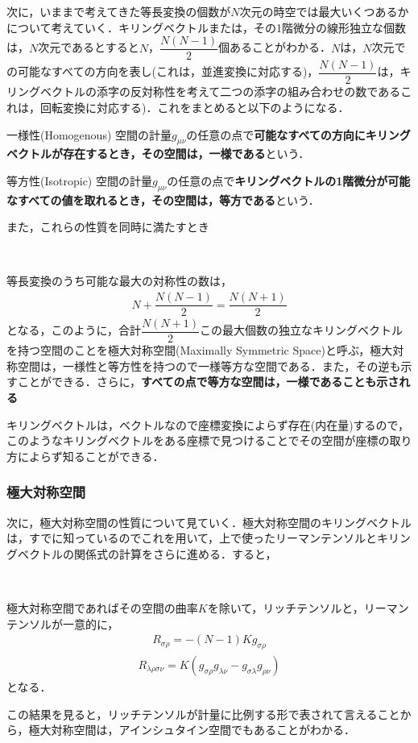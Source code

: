 次に，いままで考えてきた等長変換の個数が$N$次元の時空では最大いくつあるかについて考えていく．キリングベクトルまたは，その1階微分の線形独立な個数は，$N$次元であるとすると$N$，$\dfrac{N(N-1)}{2}$個あることがわかる．$N$は，$N$次元での可能なすべての方向を表し(これは，並進変換に対応する)，$\dfrac{N(N-1)}{2}$は，キリングベクトルの添字の反対称性を考えて二つの添字の組み合わせの数であるこれは，回転変換に対応する)．これをまとめると以下のようになる．
 \begin{itembox}[l]{一様性(Homogenous)}
空間の計量$g_{\mu\nu}$の任意の点で\textbf{可能なすべての方向にキリングベクトルが存在するとき，その空間は，一様である}という．
 \end{itembox}
 \begin{itembox}[l]{等方性(Isotropic)}
空間の計量$g_{\mu\nu}$の任意の点で\textbf{キリングベクトルの1階微分が可能なすべての値を取れるとき，その空間は，等方である}という．
\end{itembox}
また，これらの性質を同時に満たすとき
\begin{empheqboxed}
\

等長変換のうち可能な最大の対称性の数は，
\begin{eqnarray}
N+\dfrac{N(N-1)}{2}=\dfrac{N(N+1)}{2}
\end{eqnarray}
となる，このように，合計$\dfrac{N(N+1)}{2}$この最大個数の独立なキリングベクトルを持つ空間のことを極大対称空間(Maximally Symmetric Space)と呼ぶ，極大対称空間は，一様性と等方性を持つので一様等方な空間である．また，その逆も示すことができる．さらに，\textbf{すべての点で等方な空間は，一様であることも示される}
\cite{b5}
\end{empheqboxed}
キリングベクトルは，ベクトルなので座標変換によらず存在(内在量)するので，このようなキリングベクトルをある座標で見つけることでその空間が座標の取り方によらず知ることができる．

\subsubsection{極大対称空間}
次に，極大対称空間の性質について見ていく．極大対称空間のキリングベクトルは，すでに知っているのでこれを用いて，上で使ったリーマンテンソルとキリングベクトルの関係式の計算をさらに進める．すると，
\begin{empheqboxed}
\

極大対称空間であればその空間の曲率$K$を除いて，リッチテンソルと，リーマンテンソルが一意的に，
\begin{eqnarray}
R_{\sigma\rho}=-(N-1)Kg_{\sigma\rho}
\end{eqnarray}
\begin{eqnarray}
\label{RieMSS}
R_{\lambda\rho\sigma\nu}=K(g_{\sigma\rho}g_{\lambda\nu}-g_{\sigma\lambda}g_{\rho\nu})
\end{eqnarray}
となる．
\end{empheqboxed}
この結果を見ると，リッチテンソルが計量に比例する形で表されて言えることから，極大対称空間は，アインシュタイン空間でもあることがわかる．
